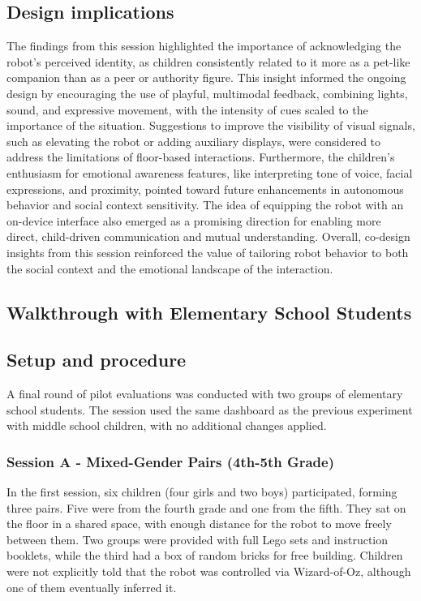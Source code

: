 \documentclass[a4paper]{usiinfbachelorproject}
\begin{document}
\subsection*{\textbf{Design implications}}
The findings from this session highlighted the importance of acknowledging the robot's perceived identity, as children consistently related to it more as a pet-like companion than as a peer or authority figure.
This insight informed the ongoing design by encouraging the use of playful, multimodal feedback, combining lights, sound, and expressive movement, with the intensity of cues scaled to the importance of the situation.
Suggestions to improve the visibility of visual signals, such as elevating the robot or adding auxiliary displays, were considered to address the limitations of floor-based interactions.
Furthermore, the children's enthusiasm for emotional awareness features, like interpreting tone of voice, facial expressions, and proximity, pointed toward future enhancements in autonomous behavior and social context sensitivity.
The idea of equipping the robot with an on-device interface also emerged as a promising direction for enabling more direct, child-driven communication and mutual understanding.
Overall, co-design insights from this session reinforced the value of tailoring robot behavior to both the social context and the emotional landscape of the interaction.

\subsection{\textbf{Walkthrough with Elementary School Students}}\label{sec:elementary-school-walkthrough}
\subsection*{\textbf{Setup and procedure}}
A final round of pilot evaluations was conducted with two groups of elementary school students.
The session used the same dashboard as the previous experiment with middle school children, with no additional changes applied.

\subsubsection*{\textbf{Session A - Mixed-Gender Pairs (4th-5th Grade)}}
In the first session, six children (four girls and two boys) participated, forming three pairs.
Five were from the fourth grade and one from the fifth.
They sat on the floor in a shared space, with enough distance for the robot to move freely between them.
Two groups were provided with full Lego sets and instruction booklets, while the third had a box of random bricks for free building.
Children were not explicitly told that the robot was controlled via Wizard-of-Oz, although one of them eventually inferred it.
\end{document}
